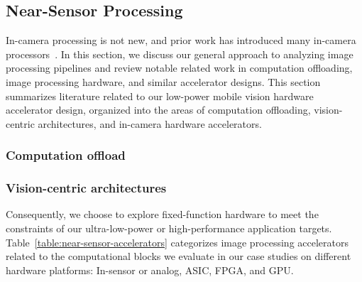 \subsection{Near-Sensor Processing} \label{sec:nsp-background}

In-camera processing is not new, and prior work has introduced many in-camera processors~\cite{hauswald2014hybrid}. In this section, we discuss our general approach to analyzing image processing pipelines and review notable related work in computation offloading, image processing hardware, and similar accelerator designs. This section summarizes literature related to our low-power mobile vision hardware accelerator design, organized into the areas of computation offloading, vision-centric architectures, and in-camera hardware accelerators.

\subsubsection{Computation offload}

\subsubsection{Vision-centric architectures}

Consequently, we choose to explore fixed-function hardware to meet the constraints of our ultra-low-power or high-performance application targets. Table~\ref{table:near-sensor-accelerators} categorizes image processing accelerators related to the computational blocks we evaluate in our case studies on different hardware platforms: In-sensor or analog, ASIC, FPGA, and GPU. 


\begin{table*}[h]
\caption{Related accelerators for in-camera processing.}
  \label{table:near-sensor-accelerators}
\end{table*}



